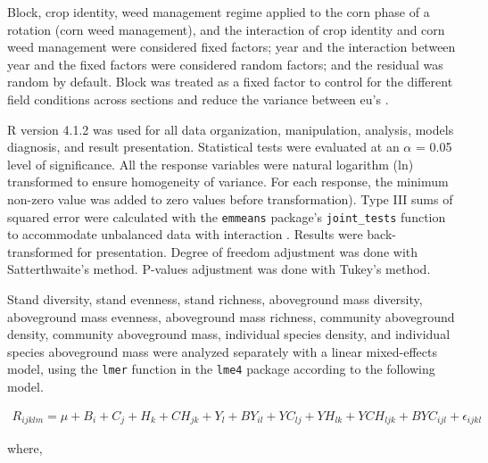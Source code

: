 \documentclass[
]{article}
\begin{document}
Block, crop identity, weed management regime applied to the corn phase of a rotation (corn weed management), and the interaction of crop identity and corn weed management were considered fixed factors; year and the interaction between year and the fixed factors were considered random factors; and the residual was random by default. Block was treated as a fixed factor to control for the different field conditions across sections and reduce the variance between eu's \citep{dixonShouldBlocksBe2016}.

R version 4.1.2 \citep{rdevelopmentcoreteamLanguageEnvironmentStatistical2021} was used for all data organization, manipulation, analysis, models diagnosis, and result presentation. Statistical tests were evaluated at an \(\alpha\) = 0.05 level of significance. All the response variables were natural logarithm (ln) transformed to ensure homogeneity of variance. For each response, the minimum non-zero value was added to zero values before transformation). Type III sums of squared error were calculated with the \texttt{emmeans} package's \texttt{joint\_tests} function to accommodate unbalanced data with interaction \citep[version 1.7.1-1,][]{lenthEmmeansEstimatedMarginal2021}. Results were back-transformed for presentation. Degree of freedom adjustment was done with Satterthwaite's method. P-values adjustment was done with Tukey's method.

Stand diversity, stand evenness, stand richness, aboveground mass diversity, aboveground mass evenness, aboveground mass richness, community aboveground density, community aboveground mass, individual species density, and individual species aboveground mass were analyzed separately with a linear mixed-effects model, using the \texttt{lmer} function in the \texttt{lme4} package \citep[version 1.1-27.1,][]{batesLme4LinearMixedEffects2021} according to the following model.

\begin{align}
R_{ijklm} = \mu + B_i + C_j + H_k + CH_{jk} + Y_l + BY_{il} + YC_{lj} + YH_{lk} + YCH_{ljk} + BYC_{ijl} + \epsilon_{ijkl}
\label{eq:index}
\end{align}

where,
\end{document}

